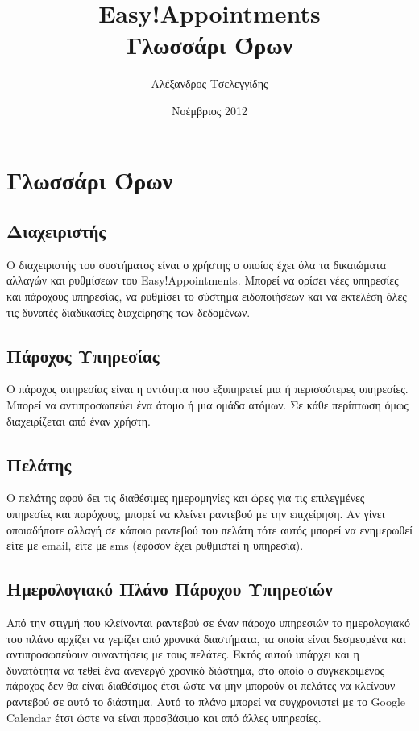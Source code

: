 \documentclass[12pt]{article}
\title{{\Huge {\bf Easy!Appointments}} \\[0.3cm] Γλωσσάρι Όρων}
\author{Αλέξανδρος Τσελεγγίδης}
\date{Νοέμβριος 2012}
\begin{document}
\maketitle 
\thispagestyle{empty} %
\pagebreak

\section {Γλωσσάρι Όρων} %
\subsection {Διαχειριστής}
Ο διαχειριστής του συστήματος είναι ο χρήστης ο οποίος έχει όλα τα δικαιώματα αλλαγών και ρυθμίσεων του Easy!Appointments. Μπορεί να ορίσει νέες υπηρεσίες και πάροχους υπηρεσίας, να ρυθμίσει το σύστημα ειδοποιήσεων και να εκτελέση όλες τις δυνατές διαδικασίες διαχείρησης των δεδομένων. 

\subsection {Πάροχος Υπηρεσίας}
Ο πάροχος υπηρεσίας είναι η οντότητα που εξυπηρετεί μια ή περισσότερες υπηρεσίες. Μπορεί να αντιπροσωπεύει ένα άτομο ή μια ομάδα ατόμων. Σε κάθε περίπτωση όμως διαχειρίζεται από έναν χρήστη.

\subsection {Πελάτης}
Ο πελάτης αφού δει τις διαθέσιμες ημερομηνίες και ώρες για τις επιλεγμένες υπηρεσίες και παρόχους, μπορεί να κλείνει ραντεβού με την επιχείρηση. Αν γίνει οποιαδήποτε αλλαγή σε κάποιο ραντεβού του πελάτη τότε αυτός μπορεί να ενημερωθεί είτε με email, είτε με sms (εφόσον έχει ρυθμιστεί η υπηρεσία).

\subsection {Ημερολογιακό Πλάνο Πάροχου Υπηρεσιών}
Από την στιγμή που κλείνονται ραντεβού σε έναν πάροχο υπηρεσιών το ημερολογιακό του πλάνο αρχίζει να γεμίζει από χρονικά διαστήματα, τα οποία είναι δεσμευμένα και αντιπροσωπεύουν συναντήσεις με τους πελάτες. Εκτός αυτού υπάρχει και η δυνατότητα να τεθεί ένα ανενεργό χρονικό διάστημα, στο οποίο ο συγκεκριμένος πάροχος δεν θα είναι διαθέσιμος έτσι ώστε να μην μπορούν οι πελάτες να κλείνουν ραντεβού σε αυτό το διάστημα. Αυτό το πλάνο μπορεί να συγχρονιστεί με το Google Calendar έτσι ώστε να είναι προσβάσιμο και από άλλες υπηρεσίες.
\end{document}
